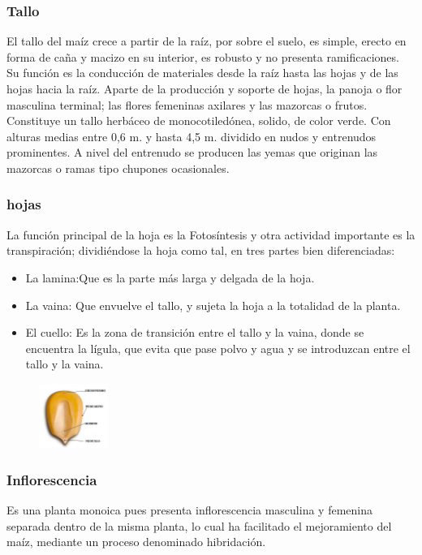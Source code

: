 \documentclass[utf8]{FrontiersinHarvard} %
\begin{document}
     \subsubsection{Tallo} 
    El tallo del maíz crece a partir de la raíz, por sobre el suelo, 
    es simple, erecto en forma de caña y macizo en su interior, 
    es robusto y no presenta ramificaciones. Su función es la conducción de 
    materiales desde la raíz hasta las hojas y de las hojas hacia la raíz. 
    Aparte de la producción y soporte de hojas, la panoja o flor masculina terminal; 
    las flores femeninas axilares y las mazorcas o frutos.
    Constituye un tallo herbáceo de monocotiledónea, solido, de color verde. 
    Con alturas medias entre 0,6 m. y hasta 4,5 m. dividido en nudos y 
    entrenudos prominentes. A nivel del entrenudo se producen las yemas que originan las mazorcas 
    o ramas tipo chupones ocasionales. 
    \subsubsection{hojas} 
    La función principal de la hoja es la Fotosíntesis y otra actividad 
    importante es la transpiración; dividiéndose la hoja como tal, 
    en tres partes bien diferenciadas:
    \begin{itemize}
        \item La lamina:Que es la parte más larga y delgada de la hoja.
        \item La vaina: Que envuelve el tallo, y sujeta la hoja a la totalidad de la planta. 
        \item El cuello: Es la zona de transición entre el tallo y la vaina, donde se encuentra la lígula, que evita que pase polvo y agua y se introduzcan entre el tallo y la vaina.
        
    \end{itemize}
       \begin{figure} %
        \centering
        \includegraphics[width=0.20\textwidth]{./images/maiz.jpg}
    \end{figure} 
    \subsubsection{Inflorescencia} 
    Es una planta monoica pues presenta inflorescencia masculina y 
    femenina separada dentro de la misma planta, 
    lo cual ha facilitado el mejoramiento del maíz,  
    mediante un proceso denominado hibridación.
\end{document}
